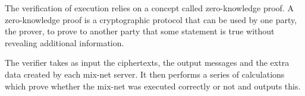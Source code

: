
The verification of execution relies on a concept called
zero-knowledge proof. A zero-knowledge proof is a cryptographic
protocol that can be used by one party, the prover, to prove to
another party that some statement is true without revealing additional
information.

The verifier takes as input the ciphertexts, the output messages and the extra data created by each mix-net server. It then performs a series of calculations which prove whether the mix-net was executed correctly or not and outputs this.

\begin{center}
\end{center}

